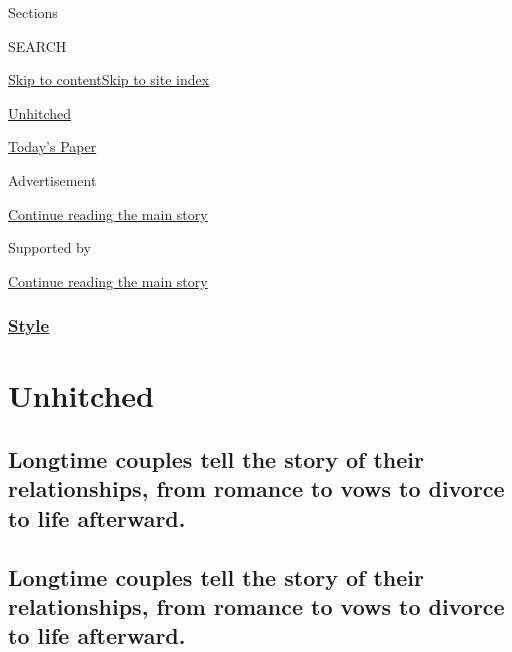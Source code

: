 Sections

SEARCH

\protect\hyperlink{site-content}{Skip to
content}\protect\hyperlink{site-index}{Skip to site index}

\href{https://www.nytimes3xbfgragh.onion/column/unhitched}{Unhitched}

\href{https://myaccount.nytimes3xbfgragh.onion/auth/login?response_type=cookie\&client_id=vi}{}

\href{https://www.nytimes3xbfgragh.onion/section/todayspaper}{Today's
Paper}

Advertisement

\protect\hyperlink{after-top}{Continue reading the main story}

Supported by

\protect\hyperlink{after-sponsor}{Continue reading the main story}

\hypertarget{style}{%
\subsubsection{\texorpdfstring{\href{/section/style}{Style}}{Style}}\label{style}}

\hypertarget{unhitched}{%
\section{Unhitched}\label{unhitched}}

\hypertarget{longtime-couples-tell-the-story-of-their-relationships-from-romance-to-vows-to-divorce-to-life-afterward}{%
\subsection{Longtime couples tell the story of their relationships, from
romance to vows to divorce to life
afterward.}\label{longtime-couples-tell-the-story-of-their-relationships-from-romance-to-vows-to-divorce-to-life-afterward}}

\hypertarget{longtime-couples-tell-the-story-of-their-relationships-from-romance-to-vows-to-divorce-to-life-afterward-1}{%
\subsection{Longtime couples tell the story of their relationships, from
romance to vows to divorce to life
afterward.}\label{longtime-couples-tell-the-story-of-their-relationships-from-romance-to-vows-to-divorce-to-life-afterward-1}}

